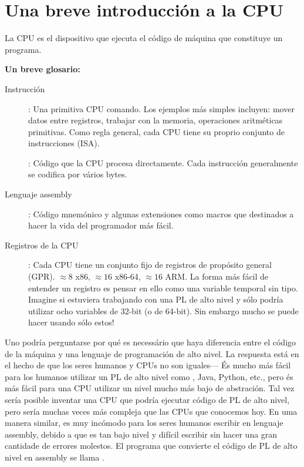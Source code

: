 \ifdefined\SPANISH
\chapter{Una breve introducción a la CPU}

La \ac{CPU} es el dispositivo que ejecuta el código de máquina que constituye un programa.

\textbf{Un breve glosario:}

\begin{description}
\item[Instrucción]: Una primitiva \ac{CPU} comando.
Los ejemplos más simples incluyen: mover datos entre registros, trabajar con la memoria, operaciones aritméticas primitivas.
Como regla general, cada \ac{CPU} tiene su proprio conjunto de instrucciones (\ac{ISA}).

\item[\ESph{}]: Código que la \ac{CPU} procesa directamente. 
Cada instrucción generalmente se codifica por vários bytes.
\item[Lenguaje assembly]: Código mnemónico y algunas extensiones como macros que destinados a hacer la vida del programador más fácil.
\item[Registros de la CPU]: 
Cada \ac{CPU} tiene un conjunto fijo de registros de propósito general (\ac{GPR}).
$\approx 8$ \ESph{} x86, $\approx 16$ \ESph{} x86-64, $\approx 16$ \ESph{} ARM.
La forma más fácil de entender un registro es pensar en ello como una variable temporal sin tipo.
Imagine si estuviera trabajando con una \ac{PL} de alto nivel y sólo podría utilizar ocho variables de 32-bit (o de 64-bit).
Sin embargo mucho se puede hacer usando sólo estos!
\end{description}

Uno podría perguntarse por qué es necessário que haya diferencia entre el código de la máquina y una lenguaje de programación de alto nivel.  La respuesta está en el hecho de que los seres humanos y CPUs no son iguales---%
És mucho más fácil para los humanos utilizar un \ac{PL} de alto nivel como \CCpp, Java, Python, etc., pero és más fácil para una \ac{CPU} utilizar un nivel mucho más bajo de abstración.
Tal vez sería posible inventar una \ac{CPU} que podría ejecutar código de \ac{PL} de alto nivel, pero sería muchas veces más compleja que las \ac{CPU}s que conocemos hoy.
En uma manera similar, es muy incómodo para los seres humanos escribir en lenguaje assembly, debido a que es tan bajo nivel y difícil escribir sin hacer una gran cantidade de errores molestos.
El programa que convierte el código de \ac{PL} de alto nivel en assembly se llama .

